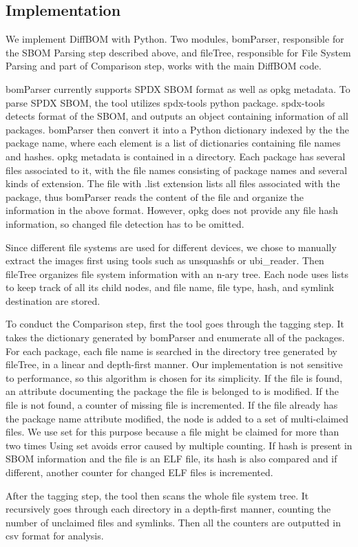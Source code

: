 \subsection{Implementation}

We implement DiffBOM with Python. Two modules, bomParser, responsible for the
SBOM Parsing step described above, and fileTree, responsible for File System
Parsing and part of Comparison step, works with the main DiffBOM code.\par

bomParser currently supports SPDX SBOM format as well as opkg metadata. To
parse SPDX SBOM, the tool utilizes spdx-tools python package. spdx-tools
detects format of the SBOM, and outputs an object containing information of all
packages. bomParser then convert it into a Python dictionary indexed by the the
package name, where each element is a list of dictionaries containing file
names and hashes. opkg metadata is contained in a directory. Each package has
several files associated to it, with the file names consisting of package names
and several kinds of extension. The file with .list extension lists all files
associated with the package, thus bomParser reads the content of the file and
organize the information in the above format. However, opkg does not provide
any file hash information, so changed file detection has to be omitted.\par

Since different file systems are used for different devices, we chose to
manually extract the images first using tools such as unsquashfs or
ubi\_reader. Then fileTree organizes file system information with an n-ary
tree. Each node uses lists to keep track of all its child nodes, and file name,
file type, hash, and symlink destination are stored.\par

To conduct the Comparison step, first the tool goes through the tagging step.
It takes the dictionary generated by bomParser and enumerate all of the
packages. For each package, each file name is searched in the directory tree
generated by fileTree, in a linear and depth-first manner. Our implementation
is not sensitive to performance, so this algorithm is chosen for its
simplicity. If the file is found, an attribute documenting the package the file
is belonged to is modified. If the file is not found, a counter of missing file
is incremented. If the file already has the package name attribute modified,
the node is added to a set of multi-claimed files. We use set for this purpose
because a file might be claimed for more than two times Using set avoids error
caused by multiple counting. If hash is present in SBOM information and the
file is an ELF file, its hash is also compared and if different, another
counter for changed ELF files is incremented.\par

After the tagging step, the tool then scans the whole file system tree. It
recursively goes through each directory in a depth-first manner, counting the
number of unclaimed files and symlinks. Then all the counters are outputted in
csv format for analysis.
